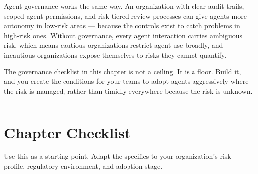 \documentclass[
  a4paper,
  DIV=11,
  numbers=noendperiod]{scrreprt}
\begin{document}
Agent governance works the same way. An organization with clear audit
trails, scoped agent permissions, and risk-tiered review processes can
give agents more autonomy in low-risk areas --- because the controls
exist to catch problems in high-risk ones. Without governance, every
agent interaction carries ambiguous risk, which means cautious
organizations restrict agent use broadly, and incautious organizations
expose themselves to risks they cannot quantify.

The governance checklist in this chapter is not a ceiling. It is a
floor. Build it, and you create the conditions for your teams to adopt
agents aggressively where the risk is managed, rather than timidly
everywhere because the risk is unknown.

\begin{center}\rule{0.5\linewidth}{0.5pt}\end{center}

\section{Chapter Checklist}\label{chapter-checklist}

Use this as a starting point. Adapt the specifics to your organization's
risk profile, regulatory environment, and adoption stage.
\end{document}
